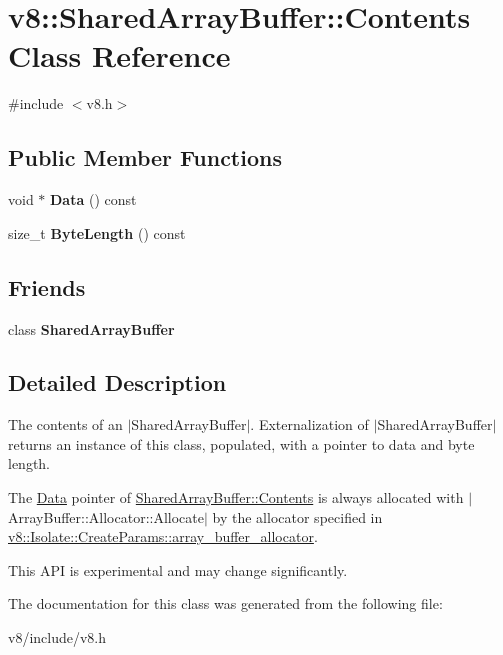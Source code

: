 \hypertarget{classv8_1_1SharedArrayBuffer_1_1Contents}{}\section{v8\+:\+:Shared\+Array\+Buffer\+:\+:Contents Class Reference}
\label{classv8_1_1SharedArrayBuffer_1_1Contents}


{\ttfamily \#include $<$v8.\+h$>$}

\subsection*{Public Member Functions}
\begin{DoxyCompactItemize}
\item 
void $\ast$ {\bfseries Data} () const \hypertarget{classv8_1_1SharedArrayBuffer_1_1Contents_a7e25a8f041d968fb7af4c4ae72dd2dc7}{}\label{classv8_1_1SharedArrayBuffer_1_1Contents_a7e25a8f041d968fb7af4c4ae72dd2dc7}

\item 
size\+\_\+t {\bfseries Byte\+Length} () const \hypertarget{classv8_1_1SharedArrayBuffer_1_1Contents_a68fb3080f3304278ec47c2cfddfec0ae}{}\label{classv8_1_1SharedArrayBuffer_1_1Contents_a68fb3080f3304278ec47c2cfddfec0ae}

\end{DoxyCompactItemize}
\subsection*{Friends}
\begin{DoxyCompactItemize}
\item 
class {\bfseries Shared\+Array\+Buffer}\hypertarget{classv8_1_1SharedArrayBuffer_1_1Contents_a35ac2a80dda42f728b7b1dfc4c3cc040}{}\label{classv8_1_1SharedArrayBuffer_1_1Contents_a35ac2a80dda42f728b7b1dfc4c3cc040}

\end{DoxyCompactItemize}


\subsection{Detailed Description}
The contents of an $\vert$\+Shared\+Array\+Buffer$\vert$. Externalization of $\vert$\+Shared\+Array\+Buffer$\vert$ returns an instance of this class, populated, with a pointer to data and byte length.

The \hyperlink{classv8_1_1Data}{Data} pointer of \hyperlink{classv8_1_1SharedArrayBuffer_1_1Contents}{Shared\+Array\+Buffer\+::\+Contents} is always allocated with $\vert$\+Array\+Buffer\+::\+Allocator\+::\+Allocate$\vert$ by the allocator specified in \hyperlink{structv8_1_1Isolate_1_1CreateParams_a7c663f70b64290392eeaf164f57585f9}{v8\+::\+Isolate\+::\+Create\+Params\+::array\+\_\+buffer\+\_\+allocator}.

This A\+PI is experimental and may change significantly. 

The documentation for this class was generated from the following file\+:\begin{DoxyCompactItemize}
\item 
v8/include/v8.\+h\end{DoxyCompactItemize}
